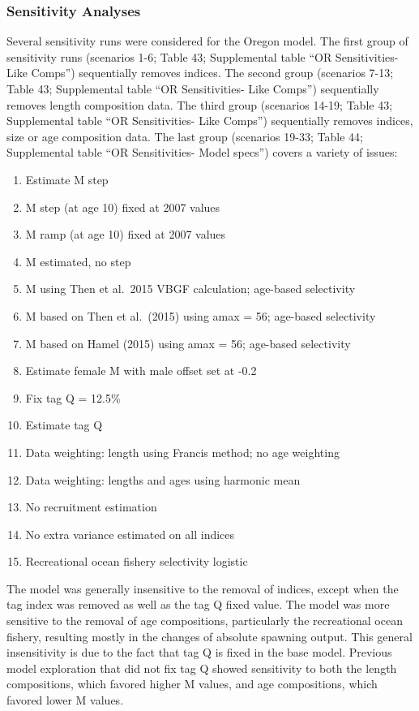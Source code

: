 \documentclass[11pt,
  english,
  letterpaper,
]{article}
\providecommand{\tightlist}{%
  \setlength{\itemsep}{0pt}\setlength{\parskip}{0pt}}
\providecommand{\tightlist}{%
  \setlength{\itemsep}{0pt}\setlength{\parskip}{0pt}}
\begin{document}
\hypertarget{sensitivity-analyses}{%
\subsubsection{Sensitivity Analyses}\label{sensitivity-analyses}}

Several sensitivity runs were considered for the Oregon model. The first group of sensitivity runs (scenarios 1-6; Table 43; Supplemental table ``OR Sensitivities- Like Comps'') sequentially removes indices. The second group (scenarios 7-13; Table 43; Supplemental table ``OR Sensitivities- Like Comps'') sequentially removes length composition data. The third group (scenarios 14-19; Table 43; Supplemental table ``OR Sensitivities- Like Comps'') sequentially removes indices, size or age composition data. The last group (scenarios 19-33; Table 44; Supplemental table ``OR Sensitivities- Model specs'') covers a variety of issues:

\begin{enumerate}
\def\labelenumi{\arabic{enumi}.}
\tightlist
\item
  Estimate M step
\item
  M step (at age 10) fixed at 2007 values
\item
  M ramp (at age 10) fixed at 2007 values
\item
  M estimated, no step
\item
  M using Then et al.~2015 VBGF calculation; age-based selectivity
\item
  M based on Then et al.~(2015) using amax = 56; age-based selectivity
\item
  M based on Hamel (2015) using amax = 56; age-based selectivity
\item
  Estimate female M with male offset set at -0.2
\item
  Fix tag Q = 12.5\%
\item
  Estimate tag Q
\item
  Data weighting: length using Francis method; no age weighting
\item
  Data weighting: lengths and ages using harmonic mean
\item
  No recruitment estimation
\item
  No extra variance estimated on all indices
\item
  Recreational ocean fishery selectivity logistic
\end{enumerate}

The model was generally insensitive to the removal of indices, except when the tag index was removed as well as the tag Q fixed value. The model was more sensitive to the removal of age compositions, particularly the recreational ocean fishery, resulting mostly in the changes of absolute spawning output. This general insensitivity is due to the fact that tag Q is fixed in the base model. Previous model exploration that did not fix tag Q showed sensitivity to both the length compositions, which favored higher M values, and age compositions, which favored lower M values.
\end{document}

